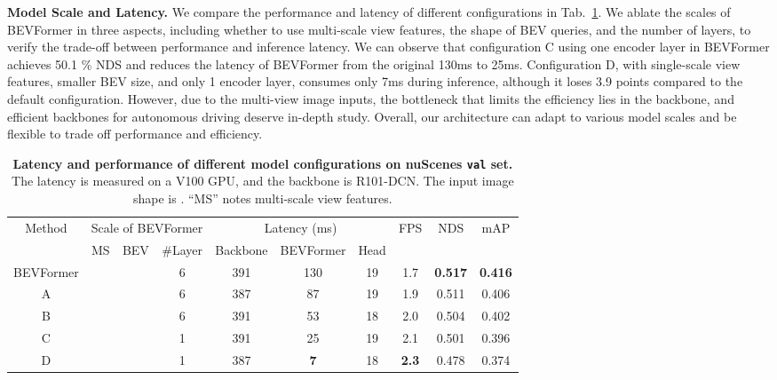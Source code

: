 \documentclass{article}
\newcommand{\cmark}{\ding{51}}\newcommand{\xmark}{\ding{55}}\definecolor{gray9}{gray}{.9}
\begin{document}
\noindent\textbf{Model Scale and Latency.} We compare the performance and latency of different configurations in Tab.~\ref{table:latency}. We ablate the scales of BEVFormer in three aspects, including whether to use multi-scale view features, the shape of BEV queries, and the number of layers, to verify the trade-off between performance and inference latency. We can observe that configuration C using one encoder layer in BEVFormer achieves 50.1 \% NDS and reduces the latency of  BEVFormer from the original 130ms to 25ms. Configuration D, with single-scale view features, smaller BEV size, and only 1 encoder layer, consumes only 7ms during inference, although it loses 3.9 points compared to the default configuration. However, due to the multi-view image inputs, the bottleneck that limits the efficiency lies in the backbone, and efficient backbones for autonomous driving deserve in-depth study.
Overall, our architecture can adapt to various model scales and be flexible to trade off performance and efficiency.





\begin{table}[t] 
\begin{center}

\caption{
\textbf{Latency and performance of different model configurations on nuScenes \texttt{val} set.} The latency is measured on a V100 GPU, and the backbone is R101-DCN. The input image shape is . ``MS'' notes multi-scale view features.
}
\setlength{\tabcolsep}{1.4mm}
\begin{tabular}{c| c c c | c c  c|c | c c}
\toprule
\multirow{2}{*}{Method}&
\multicolumn{3}{c|}{Scale of BEVFormer}
 &  \multicolumn{3}{c|}{Latency (ms)}&  \multirow{2}{*}{FPS} &\multirow{2}{*}{NDS} &\multirow{2}{*}{mAP}\\
&MS&BEV&\#Layer& Backbone & BEVFormer & Head&\\
\midrule
BEVFormer & \cmark& & 6 &391 & 130& 19 &1.7&\textbf{0.517}&\textbf{0.416}\\
\midrule
A & \xmark& & 6 & 387& 87& 19&1.9&0.511&0.406\\
B & \cmark& & 6 & 391& 53& 18&2.0&0.504&0.402\\
C & \cmark& & 1 & 391& 25& 19&2.1&0.501&0.396\\
D & \xmark& & 1 & 387& \textbf{7}& 18&\textbf{2.3}&0.478&0.374\\
\bottomrule

\end{tabular} \label{table:latency}
\end{center}
\end{table}
\end{document}
